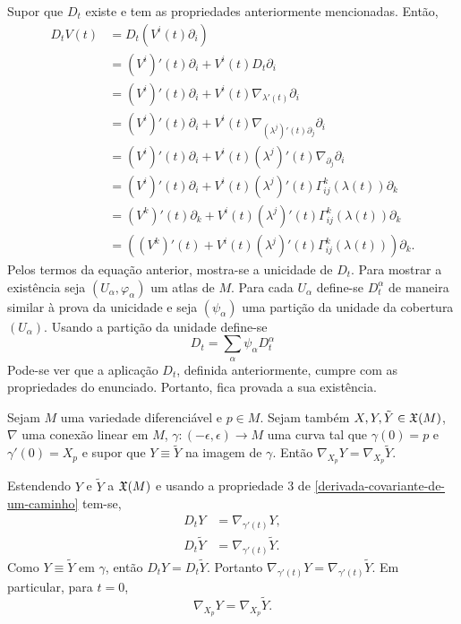 \begin{demonstracao}
	Supor que $D_t$ existe e tem as propriedades anteriormente mencionadas.
	Então,
	\begin{align*}
	D_t V(t) &= D_t \left(V^i(t) \partial_i\right)\\
	&= (V^i)'(t) \partial_i + V^i(t) D_t \partial_i\\
	&= (V^i)'(t) \partial_i + V^i(t) \nabla_{\lambda'(t)} \partial_i\\
	&= (V^i)'(t) \partial_i + V^i(t) \nabla_{(\lambda^j)'(t) \partial_j} \partial_i\\
	&= (V^i)'(t) \partial_i + V^i(t) (\lambda^j)'(t)  \nabla_{\partial_j} \partial_i\\
	&= (V^i)'(t) \partial_i + V^i(t) (\lambda^j)'(t) \Gamma_{ij}^k(\lambda(t)) \partial_k\\
	&= (V^k)'(t) \partial_k + V^i(t) (\lambda^j)'(t) \Gamma_{ij}^k(\lambda(t)) \partial_k\\
	&= \left((V^k)'(t)  + V^i(t) (\lambda^j)'(t) \Gamma_{ij}^k(\lambda(t))\right) \partial_k.
	\end{align*}
	Pelos termos da equação anterior, mostra-se a unicidade de $D_t$.
	Para mostrar a existência
	seja $(U_{\alpha}, \varphi_{\alpha})$ um atlas de $M$.
	Para cada $U_{\alpha}$ define-se $D_t^{\alpha}$ de maneira similar à prova da unicidade e
	seja $(\psi_{\alpha})$ uma partição da unidade da cobertura $(U_{\alpha})$.
	Usando a partição da unidade define-se
	\begin{equation*}
	D_t = \sum_{\alpha} \psi_{\alpha} D_t^{\alpha}
	\end{equation*}
	Pode-se ver que a aplicação $D_t$, definida anteriormente, cumpre com as propriedades do enunciado.
	Portanto, fica provada a sua existência. 
\end{demonstracao}

\begin{lema}\label{conexao-linear-numa-curva}
	Sejam $M$ uma variedade diferenciável e $p \in M$. Sejam também $X, Y, \tilde{Y} \in \mathfrak{X}(M)$, $\nabla$ uma conexão linear em $M$, $\gamma: (-\epsilon, \epsilon) \rightarrow M$ uma curva tal que $\gamma(0)=p$ e  $\gamma'(0) = X_p$ e supor que $Y \equiv \tilde{Y}$ na imagem de $\gamma$. Então $\nabla_{X_p} Y = \nabla_{X_p} \tilde{Y}$.
\end{lema}

\begin{demonstracao}
	Estendendo $Y$ e $\tilde{Y}$ a $\mathfrak{X}(M)$ e usando a propriedade 3 de \ref{derivada-covariante-de-um-caminho} tem-se,
	\begin{align*}
		D_t Y &= \nabla_{\gamma'(t)} Y,\\
		D_t \tilde{Y} &= \nabla_{\gamma'(t)} \tilde{Y}.
	\end{align*}
	Como $Y \equiv \tilde{Y}$ em $\gamma$, então $D_t Y = D_t \tilde{Y}$.
	Portanto $\nabla_{\gamma'(t)} Y = \nabla_{\gamma'(t)} \tilde{Y}$.
	Em particular, para $t=0$,
	\begin{equation*}
		\nabla_{X_p} Y = \nabla_{X_p} \tilde{Y}.
	\end{equation*}
\end{demonstracao}

